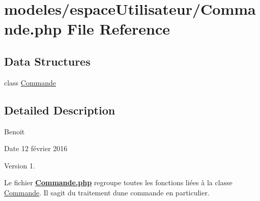 \hypertarget{_commande_8php}{}\section{modeles/espace\+Utilisateur/\+Commande.php File Reference}
\label{_commande_8php}
\subsection*{Data Structures}
\begin{DoxyCompactItemize}
\item 
class \hyperlink{class_commande}{Commande}
\end{DoxyCompactItemize}


\subsection{Detailed Description}
Benoit \begin{DoxyDate}{Date}
12 février 2016 
\end{DoxyDate}
\begin{DoxyVersion}{Version}
1.
\end{DoxyVersion}
Le fichier {\bfseries \hyperlink{_commande_8php}{Commande.\+php}} regroupe toutes les fonctions liées à la classe \hyperlink{class_commande}{Commande}. Il s\textquotesingle{}agit du traitement d\textquotesingle{}une commande en particulier. 